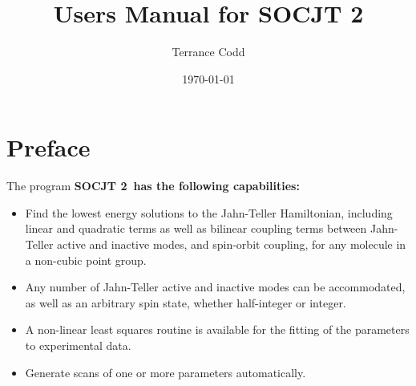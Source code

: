 \documentclass{article}
\newcommand{\socjttwo}{\bf{SOCJT 2}}
\newenvironment{bulletlist}{%
  \renewcommand{\labelitemi}{$\bullet $}%
     \begin{itemize}}{\end{itemize}}
\begin{document}
\author{Terrance Codd}
\title{Users Manual for \socjttwo}

\date{\today}

\maketitle

\tableofcontents
\newpage

\setcounter{section}{-1}
\section{Preface} \label{section:preface}

The program \socjttwo\ has the following
capabilities: 
\begin{bulletlist}
\item Find the lowest energy solutions to the Jahn-Teller Hamiltonian, including linear and quadratic terms as well as bilinear coupling terms between Jahn-Teller active and inactive modes, and spin-orbit coupling, for any molecule in a non-cubic point group.
\item Any number of Jahn-Teller active and inactive modes can be accommodated, as well as an arbitrary spin state, whether half-integer or integer.
\item A non-linear least squares routine is available for the fitting of the parameters to experimental data.
\item Generate scans of one or more parameters automatically.
\end{bulletlist}
\end{document}
